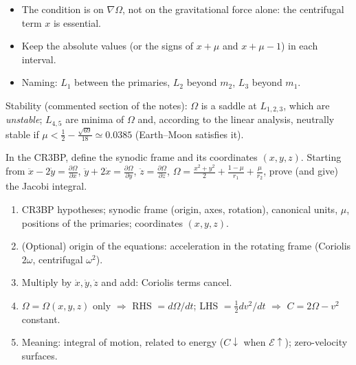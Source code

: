 \pitfalls
\begin{itemize}
\item The condition is on $\nabla\Omega$, not on the gravitational force alone: the centrifugal term $x$ is essential.
\item Keep the absolute values (or the signs of $x+\mu$ and $x+\mu-1$) in each interval.
\item Naming: $L_1$ between the primaries, $L_2$ beyond $m_2$, $L_3$ beyond $m_1$.
\end{itemize}

\further
Stability (commented section of the notes): $\Omega$ is a saddle at $L_{1,2,3}$, which are \emph{unstable}; $L_{4,5}$ are minima of
$\Omega$ and, according to the linear analysis, neutrally stable if $\mu<\frac12-\frac{\sqrt{69}}{18}\simeq0.0385$ (Earth--Moon
satisfies it).


\begin{qbox}
In the CR3BP, define the synodic frame and its coordinates $(x,y,z)$. Starting from
$\ddot x-2\dot y=\frac{\partial\Omega}{\partial x}$, $\ddot y+2\dot x=\frac{\partial\Omega}{\partial y}$, $\ddot z=\frac{\partial\Omega}{\partial z}$,
$\Omega=\frac{x^2+y^2}{2}+\frac{1-\mu}{r_1}+\frac{\mu}{r_2}$, prove (and give) the Jacobi integral.
\end{qbox}

\begin{outline}
\begin{enumerate}
\item CR3BP hypotheses; synodic frame (origin, axes, rotation), canonical units, $\mu$, positions of the primaries; coordinates $(x,y,z)$.
\item (Optional) origin of the equations: acceleration in the rotating frame (Coriolis $2\omega$, centrifugal $\omega^2$).
\item Multiply by $\dot x,\dot y,\dot z$ and add: Coriolis terms cancel.
\item $\Omega=\Omega(x,y,z)$ only $\Rightarrow$ RHS $=d\Omega/dt$; LHS $=\frac12 dv^2/dt$ $\Rightarrow$ $C=2\Omega-v^2$ constant.
\item Meaning: integral of motion, related to energy ($C\downarrow$ when $\mathcal E\uparrow$); zero-velocity surfaces.
\end{enumerate}
\end{outline}

